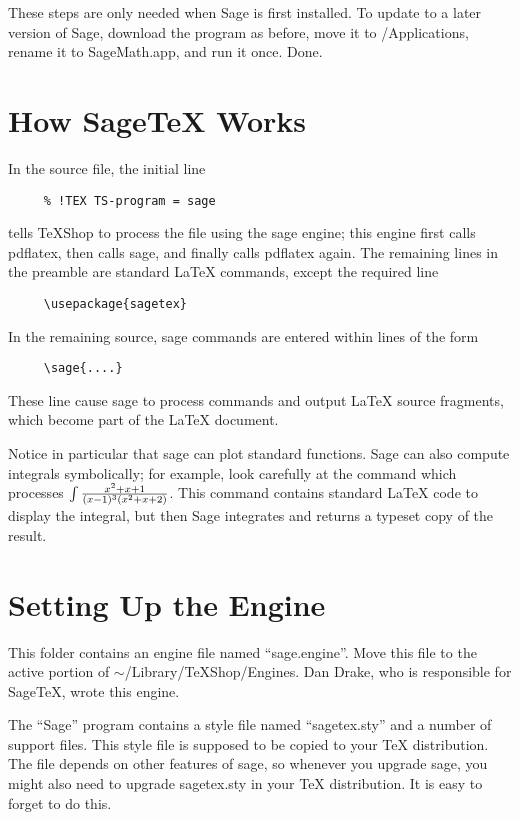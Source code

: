 \documentclass[11pt, oneside]{amsart}
\begin{document}
These steps are only needed when Sage is first installed. To update to a later version of Sage, download the program as before, move it to /Applications, rename it to SageMath.app, and run it once. Done.

\section{How SageTeX Works}

 In the source file, the initial line
\begin{verbatim}
     % !TEX TS-program = sage
\end{verbatim}
tells TeXShop to process the file using the sage engine; this engine first calls pdflatex, then calls sage, and finally calls pdflatex again.
The remaining lines in the preamble are standard LaTeX commands, except the required line
\begin{verbatim}
     \usepackage{sagetex}
\end{verbatim}
In the remaining source, sage commands are entered within lines of the form
\begin{verbatim}
     \sage{....}
\end{verbatim}
These line cause sage to process commands and output LaTeX source fragments, which become part of the LaTeX document.

Notice in particular that sage can plot standard functions. Sage can also compute integrals symbolically; for example, look carefully at the command which processes $\int {{x^2 + x + 1} \over {(x - 1)^3 (x^2 + x + 2)}}$. This command contains standard LaTeX code to display the integral, but then Sage integrates and returns a typeset copy of the result.


\section{Setting Up the Engine}

This folder contains an engine file named ``sage.engine''. Move this file to the active portion of $\sim$/Library/TeXShop/Engines. Dan Drake, who is responsible for SageTeX, wrote this engine.

The ``Sage'' program contains a style file named ``sagetex.sty'' and a number of support files. This style file is supposed to be copied to your TeX distribution. The file depends on other features of sage, so whenever you upgrade sage, you might also need to upgrade sagetex.sty in your TeX distribution. It is easy to forget to do this.
\end{document}
